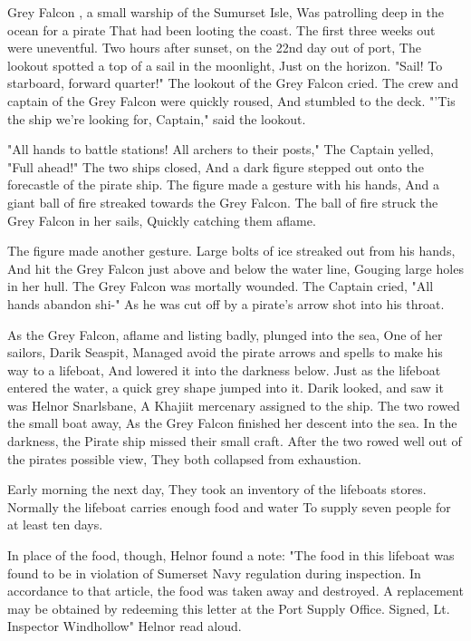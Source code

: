 
 Grey Falcon , a small warship of the Sumurset Isle, Was patrolling deep in the ocean for a pirate That had been looting the coast. The first three weeks out were uneventful. Two hours after sunset, on the 22nd day out of port, The lookout spotted a top of a sail in the moonlight, Just on the horizon. "Sail! To starboard, forward quarter!" The lookout of the Grey Falcon cried. The crew and captain of the Grey Falcon were quickly roused, And stumbled to the deck. "'Tis the ship we're looking for, Captain," said the lookout.

"All hands to battle stations! All archers to their posts," The Captain yelled, "Full ahead!" The two ships closed, And a dark figure stepped out onto the forecastle of the pirate ship. The figure made a gesture with his hands, And a giant ball of fire streaked towards the Grey Falcon. The ball of fire struck the Grey Falcon in her sails, Quickly catching them aflame.

The figure made another gesture. Large bolts of ice streaked out from his hands, And hit the Grey Falcon just above and below the water line, Gouging large holes in her hull. The Grey Falcon was mortally wounded. The Captain cried, "All hands abandon shi-" As he was cut off by a pirate's arrow shot into his throat.

As the Grey Falcon, aflame and listing badly, plunged into the sea, One of her sailors, Darik Seaspit, Managed avoid the pirate arrows and spells to make his way to a lifeboat, And lowered it into the darkness below. Just as the lifeboat entered the water, a quick grey shape jumped into it. Darik looked, and saw it was Helnor Snarlsbane, A Khajiit mercenary assigned to the ship. The two rowed the small boat away, As the Grey Falcon finished her descent into the sea. In the darkness, the Pirate ship missed their small craft. After the two rowed well out of the pirates possible view, They both collapsed from exhaustion.

Early morning the next day, They took an inventory of the lifeboats stores. Normally the lifeboat carries enough food and water To supply seven people for at least ten days.

In place of the food, though, Helnor found a note: "The food in this lifeboat was found to be in violation of Sumerset Navy regulation during inspection. In accordance to that article, the food was taken away and destroyed. A replacement may be obtained by redeeming this letter at the Port Supply Office. Signed, Lt. Inspector Windhollow" Helnor read aloud.

